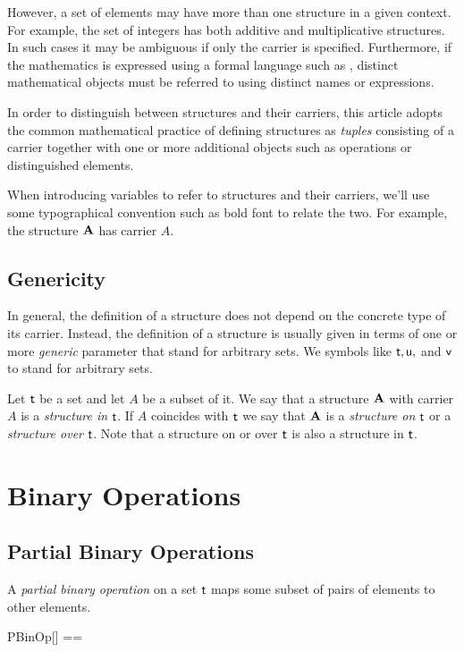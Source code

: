 \documentclass{amsart}
\begin{document}
However, a set of elements may have more than one structure in a given context.
For example, the set of integers has both additive and multiplicative structures.
In such cases it may be ambiguous if only the carrier is specified.
Furthermore, if the mathematics is expressed using a formal language such as \ZN, 
distinct mathematical objects
must be referred to using distinct names or expressions.

In order to distinguish between structures and their carriers, 
this article adopts the common mathematical practice of defining structures as \textit{tuples}
consisting of a carrier together with one or more additional objects such as operations or
distinguished elements.

When introducing variables to refer to structures and their carriers,
we'll use some typographical convention such as bold font to relate the two.
For example, the structure $\mathbf{A}$ has carrier $A$.

\subsection{Genericity}

In general, the definition of a structure does not depend on the concrete type
of its carrier.
Instead, the definition of a structure is usually given in terms of one or more \textit{generic} parameter
that stand for arbitrary sets.
We symbols like $\mathsf{t}, \mathsf{u},$  and $\mathsf{v}$ to stand for arbitrary sets. 

Let $\mathsf{t}$ be a set and let $A$ be a subset of it.
We say that a structure $\mathbf{A}$ with carrier $A$ is a \textit{structure in} $\mathsf{t}$.
If $A$ coincides with $\mathsf{t}$ we say that $\mathbf{A}$ is a \textit{structure on} $\mathsf{t}$
or a \textit{structure over} $\mathsf{t}$.
Note that a structure on or over $\mathsf{t}$ is also a structure in $\mathsf{t}$.

\section{Binary Operations}

\subsection{Partial Binary Operations}

A \textit{partial binary operation} on a set $\mathsf{t}$ maps some subset of pairs of elements to other elements.

\begin{zed}
	PBinOp[\genT] == \genT \cross \genT \pfun \genT
\end{zed}
\end{document}
